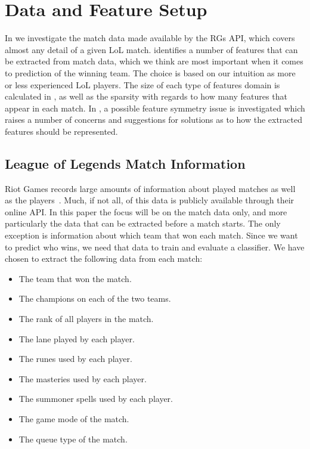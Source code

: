 \section{Data and Feature Setup}\label{sec:features}
In  we investigate the match data made available by the RGs API, which covers almost any detail of a given LoL match.
 identifies a number of features that can be extracted from match data, which we think are most important when it comes to prediction of the winning team. The choice is based on our intuition as more or less experienced LoL players. The size of each type of features domain is calculated in , as well as the sparsity with regards to how many features that appear in each match.
In , a possible feature symmetry issue is investigated which raises a number of concerns and suggestions for solutions as to how the extracted features should be represented. 


\subsection{League of Legends Match Information}\label{sec:matchdata}
Riot Games records large amounts of information about played matches as well as the players~\cite{matchinfo}. Much, if not all, of this data is publicly available through their online API. In this paper the focus will be on the match data only, and more particularly the data that can be extracted before a match starts. The only exception is information about which team that won each match. Since we want to predict who wins, we need that data to train and evaluate a classifier.
We have chosen to extract the following data from each match:
\begin{itemize}
\item The team that won the match.
\item The champions on each of the two teams.
\item The rank of all players in the match.
\item The lane played by each player.
\item The runes used by each player.
\item The masteries used by each player.
\item The summoner spells used by each player.
\item The game mode of the match.
\item The queue type of the match.
\end{itemize}

